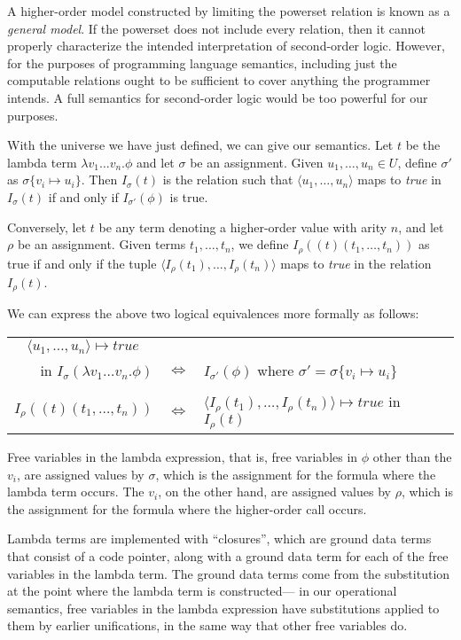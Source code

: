 A higher-order model constructed by limiting the powerset relation
is known as a \emph{general model}.
If the powerset does not include every relation,
then it cannot properly characterize the intended interpretation
of second-order logic.
However, for the purposes of programming language semantics,
including just the computable relations
ought to be sufficient to cover
anything the programmer intends.
A full semantics for second-order logic
would be too powerful for our purposes.

With the universe we have just defined,
we can give our semantics.
Let $t$ be the lambda term $\lambda v_1 \ldots v_n. \phi$
and let $\sigma$ be an assignment.
Given $u_1, \ldots, u_n \in U$,
define $\sigma'$ as $\sigma \{ v_i \mapsto u_i \}$.
Then $I_\sigma(t)$ is the relation such that
$\langle u_1, \ldots, u_n \rangle$ maps to \textit{true} in $I_\sigma(t)$
if and only if $I_{\sigma'}(\phi)$ is true.

Conversely, let $t$ be any term denoting a higher-order value with arity $n$,
and let $\rho$ be an assignment.
Given terms $t_1, \ldots, t_n$,
we define $I_\rho((t)(t_1, \ldots, t_n))$ as true
if and only if the tuple
$\langle I_\rho(t_1), \ldots, I_\rho(t_n) \rangle$
maps to \textit{true} in the relation $I_\rho(t)$.

We can express the above two logical equivalences
more formally as follows:

\begin{center}
\begin{tabular}{rcl}
$\langle u_1, \ldots, u_n \rangle \mapsto \mathit{true} \quad$ & &
\\
in $I_\sigma(\lambda v_1 \ldots v_n. \phi)$
& $\iff$ &
$I_{\sigma'}(\phi)$
where $\sigma' = \sigma \{ v_i \mapsto u_i \}$
\\
\\
$I_\rho((t)(t_1, \ldots, t_n))$
& $\iff$ &
$\langle I_\rho(t_1), \ldots, I_\rho(t_n) \rangle
\mapsto \mathit{true}$ in $I_\rho(t)$
\\
\end{tabular}
\end{center}

\noindent
Free variables in the lambda expression,
that is, free variables in $\phi$ other than the $v_i$,
are assigned values by $\sigma$,
which is the assignment for the formula
where the lambda term occurs.
The $v_i$, on the other hand,
are assigned values by $\rho$,
which is the assignment for the formula
where the higher-order call occurs.

Lambda terms are implemented with ``closures\label{gi:closure}'',
which are ground data terms that consist of a code pointer,
along with a ground data term for each of the free variables
in the lambda term.
The ground data terms come from the substitution
at the point where the lambda term is constructed---%
in our operational semantics,
free variables in the lambda expression
have substitutions applied to them by earlier unifications,
in the same way that other free variables do.

